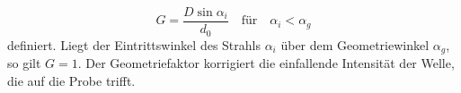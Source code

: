 \begin{equation}
    G = \frac{D \sin \alpha_i}{d_0} \quad \text{für} \quad \alpha_i < \alpha_g
    \label{eqn:geometriefaktor}
\end{equation}
definiert.
Liegt der Eintrittswinkel des Strahls $\alpha_i$ über dem Geometriewinkel $\alpha_g$, so gilt $G=1$.
Der Geometriefaktor korrigiert die einfallende Intensität der Welle, die auf die Probe trifft.
